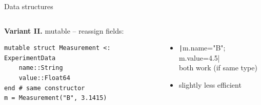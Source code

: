 \documentclass[aspectratio=169, 12pt]{beamer}
\begin{document}
\begin{frame}[fragile]{Data structures}
\begin{columns}[T]
\begin{column}{.5\textwidth}
\begin{itemize}[<+->]
                \end{itemize}
            \end{column}
        \end{columns}
        \pause
        \vspace{1\baselineskip}
        \begin{columns}[T]
            \begin{column}{.51\textwidth}
                \textbf{Variant II.} mutable – reassign fields:
                \begin{verbatim}
mutable struct Measurement <: ExperimentData
    name::String
    value::Float64
end # same constructor
m = Measurement("B", 3.1415)
                \end{verbatim}
            \end{column}
            \begin{column}{.48\textwidth}
                \pause
                \ \\[1.5\baselineskip]
                \begin{itemize}[<+->]
                    \item \texttt|m.name="B"; m.value=4.5|\\
                    both work (if same type)
                    \item slightly less efficient
                \end{itemize}
            \end{column}
        \end{columns}
    \end{frame}
\end{document}
